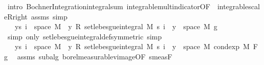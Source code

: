 \begin{isabellebody}
\ {\isacharparenleft}{\kern0pt}intro\ Bochner{\isacharunderscore}{\kern0pt}Integration{\isachardot}{\kern0pt}integral{\isacharunderscore}{\kern0pt}sum\ integrable{\isacharunderscore}{\kern0pt}mult{\isacharunderscore}{\kern0pt}indicator{\isacharbrackleft}{\kern0pt}OF\ {\isacharunderscore}{\kern0pt}\ integrable{\isacharunderscore}{\kern0pt}scaleR{\isacharunderscore}{\kern0pt}right{\isacharbrackright}{\kern0pt}\ assms{\isacharparenleft}{\kern0pt}{}{\isacharparenright}{\kern0pt}{\isacharparenright}{\kern0pt}\ simp\isanewline
\ \ \ \ \ \ \ \ \isamarkupfalse%
\ \isamarkupfalse%
\ {\isachardoublequoteopen}{\isachardot}{\kern0pt}{\isachardot}{\kern0pt}{\isachardot}{\kern0pt}\ {\isacharequal}{\kern0pt}\ {\isacharparenleft}{\kern0pt}{\isasymSum}y{\isasymin}s\ i\ {\isacharbackquote}{\kern0pt}\ space\ M{\isachardot}{\kern0pt}\ \ y\ {\isacharasterisk}{\kern0pt}\isactrlsub R\ set{\isacharunderscore}{\kern0pt}lebesgue{\isacharunderscore}{\kern0pt}integral\ M\ {\isacharparenleft}{\kern0pt}s\ i\ {\isacharminus}{\kern0pt}{\isacharbackquote}{\kern0pt}\ {\isacharbraceleft}{\kern0pt}y{\isacharbraceright}{\kern0pt}\ {\isasyminter}\ space\ M{\isacharparenright}{\kern0pt}\ g{\isacharparenright}{\kern0pt}{\isachardoublequoteclose}\ \isamarkupfalse%
\ {\isacharparenleft}{\kern0pt}simp\ only{\isacharcolon}{\kern0pt}\ set{\isacharunderscore}{\kern0pt}lebesgue{\isacharunderscore}{\kern0pt}integral{\isacharunderscore}{\kern0pt}def{\isacharbrackleft}{\kern0pt}symmetric{\isacharbrackright}{\kern0pt}{\isacharparenright}{\kern0pt}\ simp\isanewline
\ \ \ \ \ \ \ \ \isamarkupfalse%
\ \isamarkupfalse%
\ {\isachardoublequoteopen}{\isachardot}{\kern0pt}{\isachardot}{\kern0pt}{\isachardot}{\kern0pt}\ {\isacharequal}{\kern0pt}\ {\isacharparenleft}{\kern0pt}{\isasymSum}y{\isasymin}s\ i\ {\isacharbackquote}{\kern0pt}\ space\ M{\isachardot}{\kern0pt}\ \ y\ {\isacharasterisk}{\kern0pt}\isactrlsub R\ set{\isacharunderscore}{\kern0pt}lebesgue{\isacharunderscore}{\kern0pt}integral\ M\ {\isacharparenleft}{\kern0pt}s\ i\ {\isacharminus}{\kern0pt}{\isacharbackquote}{\kern0pt}\ {\isacharbraceleft}{\kern0pt}y{\isacharbraceright}{\kern0pt}\ {\isasyminter}\ space\ M{\isacharparenright}{\kern0pt}\ {\isacharparenleft}{\kern0pt}cond{\isacharunderscore}{\kern0pt}exp\ M\ F\ g{\isacharparenright}{\kern0pt}{\isacharparenright}{\kern0pt}{\isachardoublequoteclose}\ \isamarkupfalse%
\ assms{\isacharparenleft}{\kern0pt}{}{\isacharparenright}{\kern0pt}\ subalg\ borel{\isacharunderscore}{\kern0pt}measurable{\isacharunderscore}{\kern0pt}vimage{\isacharbrackleft}{\kern0pt}OF\ s{\isacharunderscore}{\kern0pt}meas{\isacharunderscore}{\kern0pt}F{\isacharbrackright}{\kern0pt}\ \isamarkupfalse%

\end{isabellebody}
